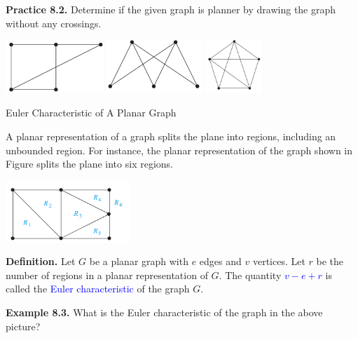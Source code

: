 \documentclass[aspectratio=169]{beamer}
\providecommand{\Blue}[1]{\textcolor{blue}{#1}}
\begin{document}
\begin{frame}[plain]{}

{\bf Practice 8.2.} Determine if the given graph is planner by
 drawing the graph without any crossings.
 
 \begin{center}
   \includegraphics[height=2cm]{./img/lecture8-fig13a.png}
   \includegraphics[height=2cm]{./img/lecture8-fig13b.png}
   \includegraphics[height=2cm]{./img/lecture8-fig13c.png}
 \end{center}
 \vspace{1.3in}
 
\end{frame}

\begin{frame}[plain]{Euler Characteristic of A Planar Graph}

A planar representation of a graph splits the plane into regions,
 including an unbounded region.
For instance, the planar representation of the graph shown in Figure 
 splits the plane into six
regions.

\begin{center}
   \includegraphics[height=2.3cm]{./img/lecture8-fig9.png}
 \end{center}
 \pause
 

{\bf Definition.} Let $G$ be a planar graph with $e$ edges and 
$v$ vertices. Let $r$ be the number of regions in a planar representation of $G$.
The quantity \Blue{$v-e+r$} is called the \Blue{Euler characteristic} of the graph $G$.
\smallskip

{\bf Example 8.3.} What is the Euler characteristic of the graph in the above picture?

 \end{frame}
\end{document}
